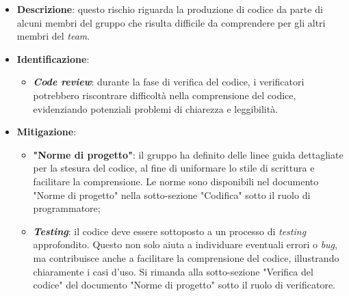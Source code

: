 \label{risk:codice incomprensibile}
\begin{itemize}
	\item \textbf{Descrizione}: questo rischio riguarda la produzione di codice 
								da parte di alcuni membri del gruppo che risulta 
								difficile da comprendere per gli altri membri del \textit{team}.
	\item \textbf{Identificazione}:
	      \begin{itemize}
		      \item \textbf{\textit{Code review}}: durante la fase di verifica del codice, 
			  									i verificatori potrebbero riscontrare difficoltà 
												nella comprensione del codice, evidenziando 
												potenziali problemi di chiarezza e leggibilità.
	      \end{itemize}

	\item \textbf{Mitigazione}:
	      \begin{itemize}
		      \item \textbf{"Norme di progetto"}: il gruppo ha definito delle linee guida dettagliate 
			  		per la stesura del codice, al fine di uniformare lo stile di scrittura e facilitare 
					la comprensione. Le norme sono disponibili nel documento "Norme di progetto" 
					nella sotto-sezione "Codifica" sotto il ruolo di programmatore;

		      \item \textbf{\textit{Testing}}: il codice deve essere sottoposto a un processo di 
			  	\textit{testing} approfondito. Questo non solo aiuta a individuare eventuali errori o \textit{bug}, 
					ma contribuisce anche a facilitare la comprensione del codice, illustrando 
					chiaramente i casi d'uso\g. Si rimanda alla sotto-sezione "Verifica del codice" 
					del documento "Norme di progetto" sotto il ruolo di verificatore.
	      \end{itemize}
\end{itemize}
